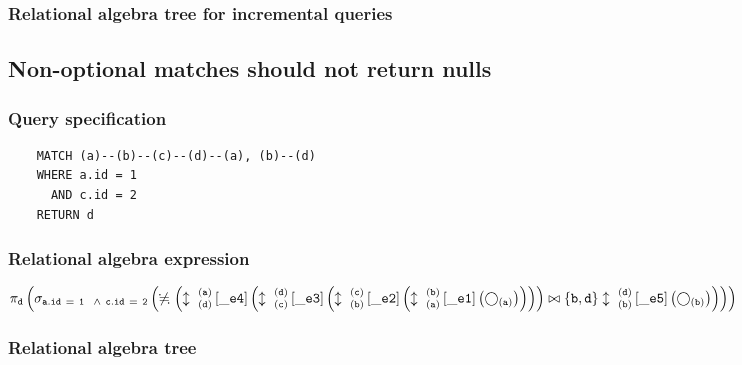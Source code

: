 	\subsubsection*{Relational algebra tree for incremental queries}

	\subsection{Non-optional matches should not return nulls}

	\subsubsection*{Query specification}

	\begin{lstlisting}
	MATCH (a)--(b)--(c)--(d)--(a), (b)--(d)
	WHERE a.id = 1
	  AND c.id = 2
	RETURN d
	\end{lstlisting}


	\subsubsection*{Relational algebra expression}

	$\projection{\var{d}} \left(\selection{\mathtt{a.id~=~1
	~~\land~c.id~=~2}} \left(\alldifferent{} \left(\expandboth{d}{a}{}{\_e4}{} \left(\expandboth{c}{d}{}{\_e3}{} \left(\expandboth{b}{c}{}{\_e2}{} \left(\expandboth{a}{b}{}{\_e1}{} \left(\getvertices{a}{}\right)\right)\right)\right) \join \{\var{b}, \var{d}\} \expandboth{b}{d}{}{\_e5}{} \left(\getvertices{b}{}\right)\right)\right)\right)$

	\subsubsection*{Relational algebra tree}

